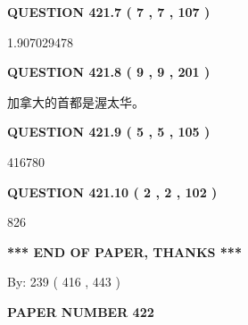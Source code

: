 \documentclass{ctexart}
\begin{document}
{\textbf{\Large{QUESTION
421.7 
 ( 7 , 7 , 107 )
}}}
  
  
 
 
\noindent{}

1.907029478
 
 
  
\vspace{0.2in}
  
{\textbf{\Large{QUESTION
421.8 
 ( 9 , 9 , 201 )
}}}
  
  
 
 
\noindent{}
 
 
加拿大的首都是渥太华。
 
 
 
 
  
\vspace{0.2in}
  
{\textbf{\Large{QUESTION
421.9 
 ( 5 , 5 , 105 )
}}}
  
  
 
 
\noindent{}

416780
 
 
  
\vspace{0.2in}
  
{\textbf{\Large{QUESTION
421.10 
 ( 2 , 2 , 102 )
}}}
  
  
 
 
\noindent{}

826
 
 
   
   
 \vspace{0.2in}
 
   
   
   
   
\vspace{1.0in} 
{\textbf{\large{ *** END OF PAPER, THANKS *** }}} 
   
   
\hspace{1.0in} By: 
 239 ( 416 ,  443 )
   
   
   
   
\newpage 
\setcounter{page}{ 
   422001 } 
   
   
   
   
 {\textbf{ \Large{ PAPER NUMBER  422  }}}
   
\end{document}
